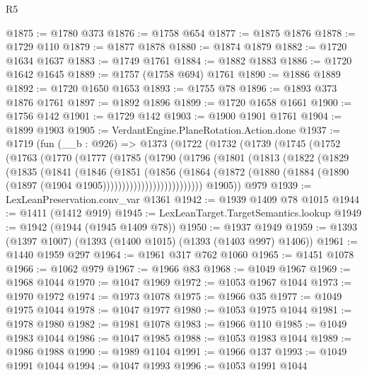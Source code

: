 \begin{lexlean}{R5}
\begin{coremodule}
@1875 := @1780 @373
@1876 := @1758 @654
@1877 := @1875 @1876
@1878 := @1729 @110
@1879 := @1877 @1878
@1880 := @1874 @1879
@1882 := @1720 @1634 @1637
@1883 := @1749 @1761
@1884 := @1882 @1883
@1886 := @1720 @1642 @1645
@1889 := @1757 (@1758 @694) @1761
@1890 := @1886 @1889
@1892 := @1720 @1650 @1653
@1893 := @1755 @78
@1896 := @1893 @373 @1876 @1761
@1897 := @1892 @1896
@1899 := @1720 @1658 @1661
@1900 := @1756 @142
@1901 := @1729 @142
@1903 := @1900 @1901 @1761
@1904 := @1899 @1903
@1905 := VerdantEngine.PlaneRotation.Action.done
@1937 := @1719
    (fun (__b : @926) =>
    @1373
      (@1722
        (@1732
          (@1739
            (@1745
              (@1752
                (@1763
                  (@1770
                    (@1777
                      (@1785
                        (@1790
                          (@1796
                            (@1801
                              (@1813
                                (@1822
                                  (@1829
                                    (@1835
                                      (@1841
                                        (@1846
                                          (@1851
                                            (@1856
                                              (@1864
                                                (@1872
                                                  (@1880
                                                    (@1884
                                                      (@1890
                                                        (@1897
                                                          (@1904 @1905))))))))))))))))))))))))))
        @1905))
    @979
@1939 := LexLeanPreservation.conv_var @1361
@1942 := @1939 @1409 @78 @1015
@1944 := @1411 (@1412 @919)
@1945 := LexLeanTarget.TargetSemantics.lookup
@1949 := @1942 (@1944 (@1945 @1409 @78))
@1950 := @1937 @1949
@1959 := @1393 (@1397 @1007) (@1393 (@1400 @1015) (@1393 (@1403 @997) @1406))
@1961 := @1440 @1959 @297
@1964 := @1961 @317 @762 @1060
@1965 := @1451 @1078
@1966 := @1062 @979
@1967 := @1966 @83
@1968 := @1049 @1967
@1969 := @1968 @1044
@1970 := @1047 @1969
@1972 := @1053 @1967 @1044
@1973 := @1970 @1972
@1974 := @1973 @1078
@1975 := @1966 @35
@1977 := @1049 @1975 @1044
@1978 := @1047 @1977
@1980 := @1053 @1975 @1044
@1981 := @1978 @1980
@1982 := @1981 @1078
@1983 := @1966 @110
@1985 := @1049 @1983 @1044
@1986 := @1047 @1985
@1988 := @1053 @1983 @1044
@1989 := @1986 @1988
@1990 := @1989 @1104
@1991 := @1966 @137
@1993 := @1049 @1991 @1044
@1994 := @1047 @1993
@1996 := @1053 @1991 @1044

\end{coremodule}
\end{lexlean}
